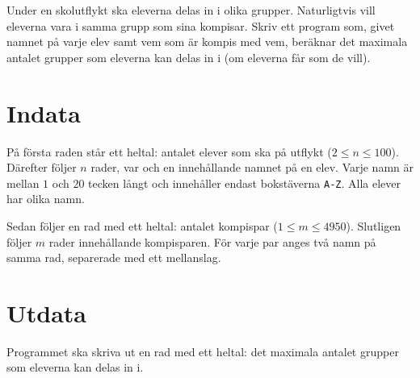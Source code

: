 Under en skolutflykt ska eleverna delas in i olika grupper.
Naturligtvis vill eleverna vara i samma grupp som sina kompisar.
Skriv ett program som, givet namnet på varje elev samt vem som är kompis med vem, beräknar det maximala antalet grupper som eleverna kan delas in i (om eleverna får som de vill).

\section*{Indata}
På första raden står ett heltal: antalet elever som ska på utflykt ($2 \le n \le 100$).
Därefter följer $n$ rader, var och en innehållande namnet på en elev.
Varje namn är mellan $1$ och $20$ tecken långt och innehåller endast bokstäverna \texttt{A-Z}.
Alla elever har olika namn.

Sedan följer en rad med ett heltal: antalet kompispar ($1 \le m \le 4950$).
Slutligen följer $m$ rader innehållande kompisparen.
För varje par anges två namn på samma rad, separerade med ett mellanslag.

\section*{Utdata}
Programmet ska skriva ut en rad med ett heltal: det maximala antalet grupper som eleverna kan delas in i.
